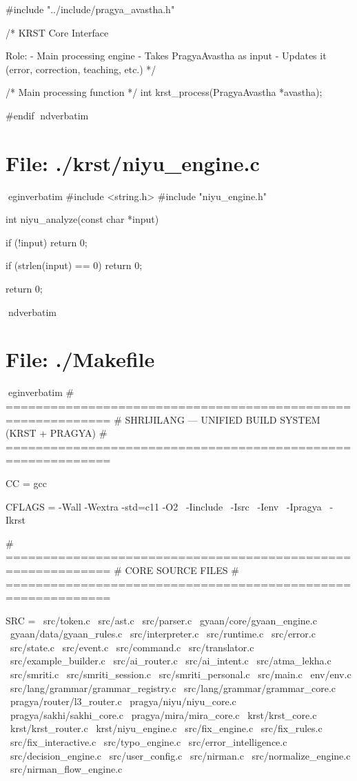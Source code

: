 \documentclass{article}
\begin{document}
#include "../include/pragya_avastha.h"

/*
    KRST Core Interface

    Role:
    - Main processing engine
    - Takes PragyaAvastha as input
    - Updates it (error, correction, teaching, etc.)
*/

/* Main processing function */
int krst_process(PragyaAvastha *avastha);

#endif
nd{verbatim}
\section*{File: ./krst/niyu_engine.c}
egin{verbatim}
#include <string.h>
#include "niyu_engine.h"

int niyu_analyze(const char *input)
{
    if (!input)
        return 0;

    if (strlen(input) == 0)
        return 0;

    return 0;
}
nd{verbatim}
\section*{File: ./Makefile}
egin{verbatim}
# ============================================================
# SHRIJILANG — UNIFIED BUILD SYSTEM (KRST + PRAGYA)
# ============================================================

CC = gcc

CFLAGS = -Wall -Wextra -std=c11 -O2 \
	-Iinclude \
	-Isrc \
	-Ienv \
	-Ipragya \
	-Ikrst

# ============================================================
# CORE SOURCE FILES
# ============================================================

SRC = \
	src/token.c \
	src/ast.c \
	src/parser.c \
	gyaan/core/gyaan_engine.c \
	gyaan/data/gyaan_rules.c \
	src/interpreter.c \
	src/runtime.c \
	src/error.c \
	src/state.c \
	src/event.c \
	src/command.c \
	src/translator.c \
	src/example_builder.c \
	src/ai_router.c \
	src/ai_intent.c \
	src/atma_lekha.c \
	src/smriti.c \
        src/smriti_session.c \
	src/smriti_personal.c \
	src/main.c \
	env/env.c \
	src/lang/grammar/grammar_registry.c \
	src/lang/grammar/grammar_core.c \
	pragya/router/l3_router.c \
	pragya/niyu/niyu_core.c \
	pragya/sakhi/sakhi_core.c \
	pragya/mira/mira_core.c \
	krst/krst_core.c \
	krst/krst_router.c \
	krst/niyu_engine.c \
	src/fix_engine.c \
	src/fix_rules.c \
	src/fix_interactive.c \
	src/typo_engine.c \
	src/error_intelligence.c \
	src/decision_engine.c \
src/user_config.c \
src/nirman.c \
src/normalize_engine.c \
src/nirman_flow_engine.c \
\end{document}
